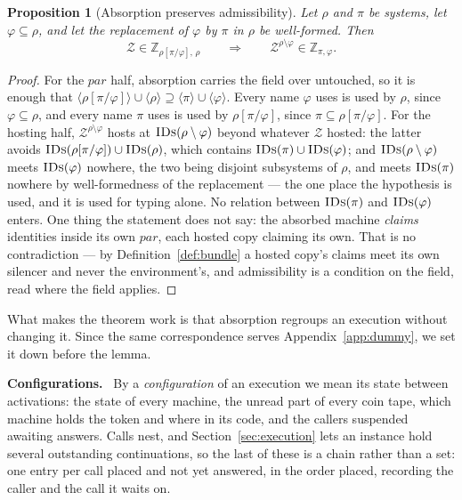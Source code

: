 \documentclass[11pt,a4paper]{article}
\newcommand{\pars}{\mathit{par}}
\newcommand{\Zenv}{\mathcal{Z}}
\newcommand{\ZenvSet}{\mathbb{Z}}
\newcommand{\op}[1]{\textsc{#1}}
\newcommand{\IDs}{\op{IDs}}
\newcommand{\ncl}[1]{\langle #1 \rangle}
\newcommand{\heading}[1]{\medskip\par\noindent\textcolor{accent}{\textbf{#1.}}\ }
\theoremstyle{accentdef}
\theoremstyle{accentplain}
\newtheorem{proposition}[definition]{Proposition}
\begin{document}
\begin{proposition}[Absorption preserves admissibility]\label{prop:absorb}
Let $\rho$ and $\pi$ be systems, let $\varphi \subseteq \rho$, and let the replacement of
$\varphi$ by $\pi$ in $\rho$ be well-formed. Then
\[
  \Zenv \in \ZenvSet_{\rho[\pi/\varphi],\,\rho}
  \qquad\Longrightarrow\qquad
  \Zenv^{\rho \setminus \varphi} \in \ZenvSet_{\pi,\varphi} .
\]
\end{proposition}

\begin{proof}
For the $\pars$ half, absorption carries the field over untouched, so it
is enough that $\ncl{\rho[\pi/\varphi]} \cup \ncl{\rho} \supseteq \ncl{\pi} \cup \ncl{\varphi}$.
Every name $\varphi$ uses is used by $\rho$, since $\varphi \subseteq \rho$, and every name $\pi$
uses is used by $\rho[\pi/\varphi]$, since $\pi \subseteq \rho[\pi/\varphi]$. For the hosting
half, $\Zenv^{\rho \setminus \varphi}$ hosts at $\IDs(\rho \setminus \varphi)$ beyond whatever
$\Zenv$ hosted: the latter avoids $\IDs(\rho[\pi/\varphi]) \cup \IDs(\rho)$, which contains
$\IDs(\pi) \cup \IDs(\varphi)$; and $\IDs(\rho \setminus \varphi)$ meets $\IDs(\varphi)$ nowhere,
the two being disjoint subsystems of $\rho$, and meets $\IDs(\pi)$ nowhere by well-formedness of
the replacement --- the one place the hypothesis is used, and it is used for typing alone. No
relation between $\IDs(\pi)$ and $\IDs(\varphi)$ enters. One thing the
statement does not say: the absorbed machine \emph{claims} identities inside its own $\pars$,
each hosted copy claiming its own. That is no contradiction --- by Definition~\ref{def:bundle} a
hosted copy's claims meet its own silencer and never the environment's, and admissibility is a
condition on the field, read where the field applies.
\end{proof}

What makes the theorem work is that absorption regroups an execution without changing it. Since the
same correspondence serves Appendix~\ref{app:dummy}, we set it down before the lemma.

\heading{Configurations} By a \emph{configuration} of an execution we mean its state between
activations: the state of every machine, the unread part of every coin tape, which machine holds
the token and where in its code, and the callers suspended awaiting answers. Calls nest, and
Section~\ref{sec:execution} lets an instance hold several outstanding continuations, so the last of
these is a chain rather than a set: one entry per call placed and not yet answered, in the order
placed, recording the caller and the call it waits on.
\end{document}
